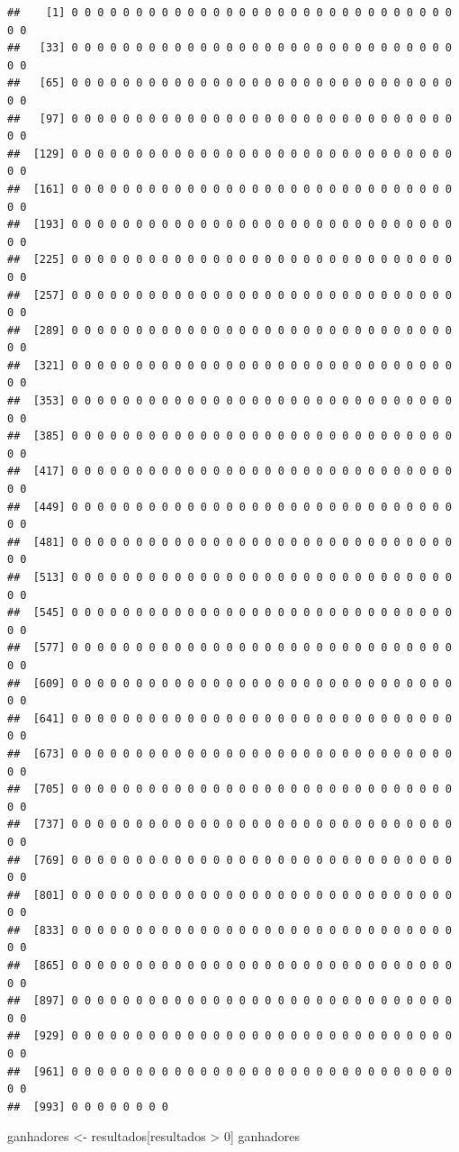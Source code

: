 \documentclass[
  11pt]{report}
\newenvironment{Shaded}{\begin{snugshade}}{\end{snugshade}}
\newcommand{\DecValTok}[1]{\textcolor[rgb]{0.00,0.00,0.81}{#1}}
\newcommand{\NormalTok}[1]{#1}
\newcommand{\OtherTok}[1]{\textcolor[rgb]{0.56,0.35,0.01}{#1}}
\newcommand{\SpecialCharTok}[1]{\textcolor[rgb]{0.00,0.00,0.00}{#1}}
\renewenvironment{Shaded}{
    \begin{mdframed}[%
      roundcorner=2pt,%
      innerleftmargin=5pt,%
      innerrightmargin=5pt,%
      topline=true,%
      leftline=true,%
      rightline=true,%
      bottomline=true,%
      linewidth=0.5pt,%
      linecolor=black!20,%
      backgroundcolor=black!2,%
      skipabove=2ex,%
      skipbelow=2.5ex%
    ]%
  }
  {
    \end{mdframed}
  }
\begin{document}
\begin{verbatim}
##    [1] 0 0 0 0 0 0 0 0 0 0 0 0 0 0 0 0 0 0 0 0 0 0 0 0 0 0 0 0 0 0 0 0
##   [33] 0 0 0 0 0 0 0 0 0 0 0 0 0 0 0 0 0 0 0 0 0 0 0 0 0 0 0 0 0 0 0 0
##   [65] 0 0 0 0 0 0 0 0 0 0 0 0 0 0 0 0 0 0 0 0 0 0 0 0 0 0 0 0 0 0 0 0
##   [97] 0 0 0 0 0 0 0 0 0 0 0 0 0 0 0 0 0 0 0 0 0 0 0 0 0 0 0 0 0 0 0 0
##  [129] 0 0 0 0 0 0 0 0 0 0 0 0 0 0 0 0 0 0 0 0 0 0 0 0 0 0 0 0 0 0 0 0
##  [161] 0 0 0 0 0 0 0 0 0 0 0 0 0 0 0 0 0 0 0 0 0 0 0 0 0 0 0 0 0 0 0 0
##  [193] 0 0 0 0 0 0 0 0 0 0 0 0 0 0 0 0 0 0 0 0 0 0 0 0 0 0 0 0 0 0 0 0
##  [225] 0 0 0 0 0 0 0 0 0 0 0 0 0 0 0 0 0 0 0 0 0 0 0 0 0 0 0 0 0 0 0 0
##  [257] 0 0 0 0 0 0 0 0 0 0 0 0 0 0 0 0 0 0 0 0 0 0 0 0 0 0 0 0 0 0 0 0
##  [289] 0 0 0 0 0 0 0 0 0 0 0 0 0 0 0 0 0 0 0 0 0 0 0 0 0 0 0 0 0 0 0 0
##  [321] 0 0 0 0 0 0 0 0 0 0 0 0 0 0 0 0 0 0 0 0 0 0 0 0 0 0 0 0 0 0 0 0
##  [353] 0 0 0 0 0 0 0 0 0 0 0 0 0 0 0 0 0 0 0 0 0 0 0 0 0 0 0 0 0 0 0 0
##  [385] 0 0 0 0 0 0 0 0 0 0 0 0 0 0 0 0 0 0 0 0 0 0 0 0 0 0 0 0 0 0 0 0
##  [417] 0 0 0 0 0 0 0 0 0 0 0 0 0 0 0 0 0 0 0 0 0 0 0 0 0 0 0 0 0 0 0 0
##  [449] 0 0 0 0 0 0 0 0 0 0 0 0 0 0 0 0 0 0 0 0 0 0 0 0 0 0 0 0 0 0 0 0
##  [481] 0 0 0 0 0 0 0 0 0 0 0 0 0 0 0 0 0 0 0 0 0 0 0 0 0 0 0 0 0 0 0 0
##  [513] 0 0 0 0 0 0 0 0 0 0 0 0 0 0 0 0 0 0 0 0 0 0 0 0 0 0 0 0 0 0 0 0
##  [545] 0 0 0 0 0 0 0 0 0 0 0 0 0 0 0 0 0 0 0 0 0 0 0 0 0 0 0 0 0 0 0 0
##  [577] 0 0 0 0 0 0 0 0 0 0 0 0 0 0 0 0 0 0 0 0 0 0 0 0 0 0 0 0 0 0 0 0
##  [609] 0 0 0 0 0 0 0 0 0 0 0 0 0 0 0 0 0 0 0 0 0 0 0 0 0 0 0 0 0 0 0 0
##  [641] 0 0 0 0 0 0 0 0 0 0 0 0 0 0 0 0 0 0 0 0 0 0 0 0 0 0 0 0 0 0 0 0
##  [673] 0 0 0 0 0 0 0 0 0 0 0 0 0 0 0 0 0 0 0 0 0 0 0 0 0 0 0 0 0 0 0 0
##  [705] 0 0 0 0 0 0 0 0 0 0 0 0 0 0 0 0 0 0 0 0 0 0 0 0 0 0 0 0 0 0 0 0
##  [737] 0 0 0 0 0 0 0 0 0 0 0 0 0 0 0 0 0 0 0 0 0 0 0 0 0 0 0 0 0 0 0 0
##  [769] 0 0 0 0 0 0 0 0 0 0 0 0 0 0 0 0 0 0 0 0 0 0 0 0 0 0 0 0 0 0 0 0
##  [801] 0 0 0 0 0 0 0 0 0 0 0 0 0 0 0 0 0 0 0 0 0 0 0 0 0 0 0 0 0 0 0 0
##  [833] 0 0 0 0 0 0 0 0 0 0 0 0 0 0 0 0 0 0 0 0 0 0 0 0 0 0 0 0 0 0 0 0
##  [865] 0 0 0 0 0 0 0 0 0 0 0 0 0 0 0 0 0 0 0 0 0 0 0 0 0 0 0 0 0 0 0 0
##  [897] 0 0 0 0 0 0 0 0 0 0 0 0 0 0 0 0 0 0 0 0 0 0 0 0 0 0 0 0 0 0 0 0
##  [929] 0 0 0 0 0 0 0 0 0 0 0 0 0 0 0 0 0 0 0 0 0 0 0 0 0 0 0 0 0 0 0 0
##  [961] 0 0 0 0 0 0 0 0 0 0 0 0 0 0 0 0 0 0 0 0 0 0 0 0 0 0 0 0 0 0 0 0
##  [993] 0 0 0 0 0 0 0 0
\end{verbatim}

\begin{Shaded}
\begin{Highlighting}[]
\NormalTok{ganhadores }\OtherTok{\textless{}{-}}\NormalTok{ resultados[resultados }\SpecialCharTok{\textgreater{}} \DecValTok{0}\NormalTok{]}
\NormalTok{ganhadores}
\end{Highlighting}
\end{Shaded}
\end{document}
